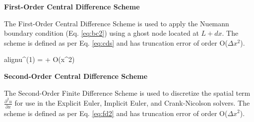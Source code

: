 \documentclass[10pt, letter, showtrims]{extarticle}
\newcommand{\boxedeq}[2]{\begin{empheq}[box={\fboxsep=6pt\fbox}]{align}\label{#1}#2\end{empheq}}
\begin{document}
		
		\noindent
		\textbf{First-Order Central Difference Scheme}
		
		\noindent
		The First-Order Central Difference Scheme is used to apply the Nuemann boundary condition (Eq. \ref{eq:bc2}) using a ghost node located at $L + dx$. The scheme is defined as per Eq. \ref{eq:cds} and has truncation error of order O($\Delta x^{2}$).
		
%		
%		
%		
%		
		
		\boxedeq{eq:cds}{u^{(1)} = \frac{u(x + \Delta x) - u(x - \Delta x)}{2 \Delta x} + O(\Delta x^{2})}
		
		\noindent
		\textbf{Second-Order Central Difference Scheme}
		
		\noindent
		The Second-Order Finite Difference Scheme is used to discretize the spatial term $\frac{\partial^{2}u}{\partial x}$ for use in the Explicit Euler, Implicit Euler, and Crank-Nicolson solvers. The scheme is defined as per Eq. \ref{eq:fd2} and has truncation error of order O($\Delta x^{2}$).
		
%		
%		
%		
		
\end{document}
